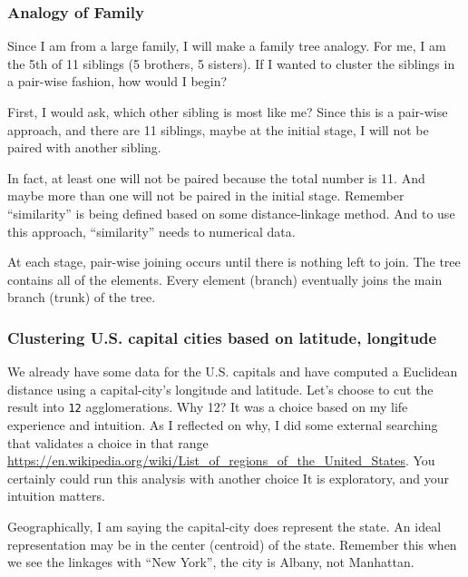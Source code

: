 \documentclass[
]{article}
\begin{document}
\hypertarget{analogy-of-family}{%
\subsubsection{Analogy of Family}\label{analogy-of-family}}

Since I am from a large family, I will make a family tree analogy. For
me, I am the 5th of 11 siblings (5 brothers, 5 sisters). If I wanted to
cluster the siblings in a pair-wise fashion, how would I begin?

First, I would ask, which other sibling is most like me? Since this is a
pair-wise approach, and there are 11 siblings, maybe at the initial
stage, I will not be paired with another sibling.

In fact, at least one will not be paired because the total number is 11.
And maybe more than one will not be paired in the initial stage.
Remember ``similarity'' is being defined based on some distance-linkage
method. And to use this approach, ``similarity'' needs to numerical
data.

At each stage, pair-wise joining occurs until there is nothing left to
join. The tree contains all of the elements. Every element (branch)
eventually joins the main branch (trunk) of the tree.

\hypertarget{clustering-u.s.-capital-cities-based-on-latitude-longitude}{%
\subsubsection{Clustering U.S. capital cities based on latitude,
longitude}\label{clustering-u.s.-capital-cities-based-on-latitude-longitude}}

We already have some data for the U.S. capitals and have computed a
Euclidean distance using a capital-city's longitude and latitude. Let's
choose to cut the result into \texttt{12} agglomerations. Why 12? It was
a choice based on my life experience and intuition. As I reflected on
why, I did some external searching that validates a choice in that range
\url{https://en.wikipedia.org/wiki/List_of_regions_of_the_United_States}.
You certainly could run this analysis with another choice It is
exploratory, and your intuition matters.

Geographically, I am saying the capital-city does represent the state.
An ideal representation may be in the center (centroid) of the state.
Remember this when we see the linkages with ``New York'', the city is
Albany, not Manhattan.
\end{document}
